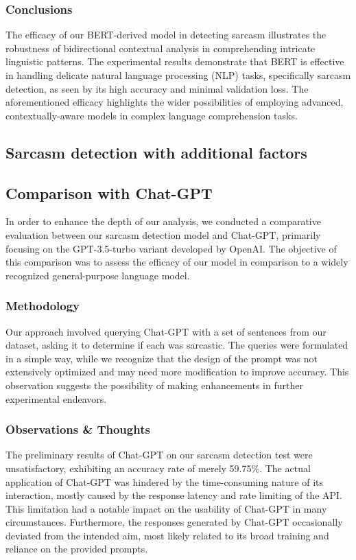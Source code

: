 \documentclass[10pt,twocolumn,letterpaper]{article}
\begin{document}
\subsubsection{Conclusions}
The efficacy of our BERT-derived model in detecting sarcasm illustrates the robustness of bidirectional contextual analysis in comprehending intricate linguistic patterns. 
The experimental results demonstrate that BERT is effective in handling delicate natural language processing (NLP) tasks, specifically sarcasm detection, as seen by its high accuracy and minimal validation loss.
The aforementioned efficacy highlights the wider possibilities of employing advanced, contextually-aware models in complex language comprehension tasks.


\subsection{Sarcasm detection with additional factors}

\subsection{Comparison with Chat-GPT}
In order to enhance the depth of our analysis, we conducted a comparative evaluation between our sarcasm detection model and Chat-GPT, primarily focusing on the GPT-3.5-turbo variant developed by OpenAI.
The objective of this comparison was to assess the efficacy of our model in comparison to a widely recognized general-purpose language model.

\subsubsection{Methodology}
Our approach involved querying Chat-GPT with a set of sentences from our dataset, asking it to determine if each was sarcastic.
The queries were formulated in a simple way, while we recognize that the design of the prompt was not extensively optimized and may need more modification to improve accuracy.
This observation suggests the possibility of making enhancements in further experimental endeavors.

\subsubsection{Observations \& Thoughts}
The preliminary results of Chat-GPT on our sarcasm detection test were unsatisfactory, exhibiting an accuracy rate of merely 59.75\%.
The actual application of Chat-GPT was hindered by the time-consuming nature of its interaction, mostly caused by the response latency and rate limiting of the API. This limitation had a notable impact on the usability of Chat-GPT in many circumstances.
Furthermore, the responses generated by Chat-GPT occasionally deviated from the intended aim, most likely related to its broad training and reliance on the provided prompts.
\end{document}
